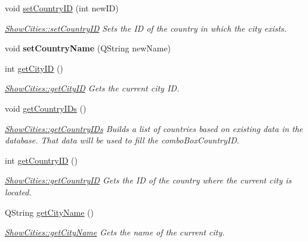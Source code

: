 \begin{DoxyCompactItemize}
void \mbox{\hyperlink{class_show_cities_a853a958ebc2c0d42d872c237d431fe25}{set\+Country\+ID}} (int new\+ID)
\begin{DoxyCompactList}\small\item\em \mbox{\hyperlink{class_show_cities_a853a958ebc2c0d42d872c237d431fe25}{Show\+Cities\+::set\+Country\+ID}} Sets the ID of the country in which the city exists. \end{DoxyCompactList}\item 
\mbox{\label{class_show_cities_a6974ab22950cede9fb290490bcc8f3a5}} 
void {\bfseries set\+Country\+Name} (Q\+String new\+Name)
\item 
int \mbox{\hyperlink{class_show_cities_ac81b38d6862643619d07f82fe12b5c02}{get\+City\+ID}} ()
\begin{DoxyCompactList}\small\item\em \mbox{\hyperlink{class_show_cities_ac81b38d6862643619d07f82fe12b5c02}{Show\+Cities\+::get\+City\+ID}} Gets the current city ID. \end{DoxyCompactList}\item 
\mbox{\label{class_show_cities_a8fa42e8a5b12579cd04ae2a8ee4a9370}} 
void \mbox{\hyperlink{class_show_cities_a8fa42e8a5b12579cd04ae2a8ee4a9370}{get\+Country\+I\+Ds}} ()
\begin{DoxyCompactList}\small\item\em \mbox{\hyperlink{class_show_cities_a8fa42e8a5b12579cd04ae2a8ee4a9370}{Show\+Cities\+::get\+Country\+I\+Ds}} Builds a list of countries based on existing data in the database. That data will be used to fill the combo\+Box\+Country\+ID. \end{DoxyCompactList}\item 
int \mbox{\hyperlink{class_show_cities_a8f66380734928e926a732a0088c1d998}{get\+Country\+ID}} ()
\begin{DoxyCompactList}\small\item\em \mbox{\hyperlink{class_show_cities_a8f66380734928e926a732a0088c1d998}{Show\+Cities\+::get\+Country\+ID}} Gets the ID of the country where the current city is located. \end{DoxyCompactList}\item 
Q\+String \mbox{\hyperlink{class_show_cities_a3640b91c66939d0070c3dd6f5b9eb93c}{get\+City\+Name}} ()
\begin{DoxyCompactList}\small\item\em \mbox{\hyperlink{class_show_cities_a3640b91c66939d0070c3dd6f5b9eb93c}{Show\+Cities\+::get\+City\+Name}} Gets the name of the current city. \end{DoxyCompactList}\item 

\end{DoxyCompactItemize}
